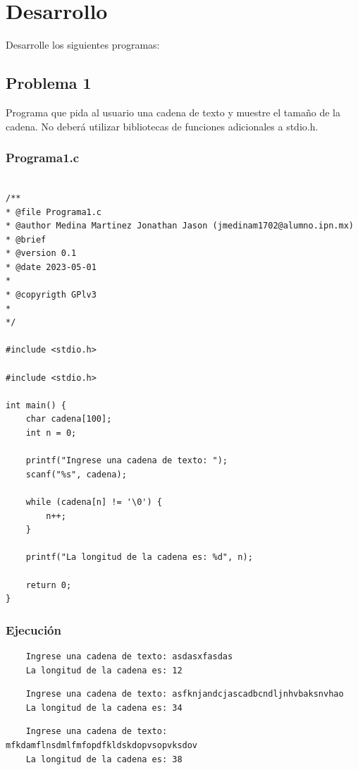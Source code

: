 \documentclass{article}
\begin{document}
	\newpage
	\section{Desarrollo}
	Desarrolle los siguientes programas:
	
	\subsection{Problema 1}
	Programa que pida al usuario una cadena de texto y muestre el tamaño de la cadena.
	No deberá utilizar bibliotecas de funciones adicionales a stdio.h.
	
	\subsubsection{Programa1.c}
	
	\begin{lstlisting}

/**
* @file Programa1.c
* @author Medina Martinez Jonathan Jason (jmedinam1702@alumno.ipn.mx)
* @brief 
* @version 0.1
* @date 2023-05-01
* 
* @copyrigth GPlv3
* 
*/

#include <stdio.h>

#include <stdio.h>

int main() {
	char cadena[100];
	int n = 0;
	
	printf("Ingrese una cadena de texto: ");
	scanf("%s", cadena);
	
	while (cadena[n] != '\0') {
		n++;
	}
	
	printf("La longitud de la cadena es: %d", n);
	
	return 0;
}
	\end{lstlisting}
	
	\subsubsection{Ejecución}
	
	\begin{lstlisting}
	Ingrese una cadena de texto: asdasxfasdas
	La longitud de la cadena es: 12
	\end{lstlisting}
	
	\begin{lstlisting}
	Ingrese una cadena de texto: asfknjandcjascadbcndljnhvbaksnvhao
	La longitud de la cadena es: 34
	\end{lstlisting}
	
	\begin{lstlisting}
	Ingrese una cadena de texto: mfkdamflnsdmlfmfopdfkldskdopvsopvksdov
	La longitud de la cadena es: 38
	\end{lstlisting}
	
\end{document}
